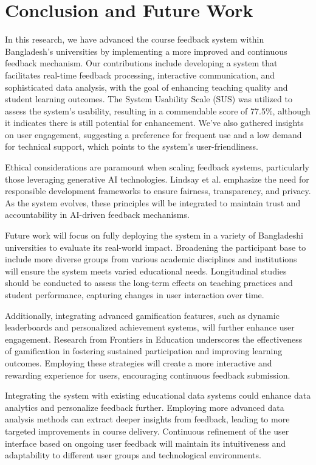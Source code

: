 \documentclass[conference]{IEEEtran}
\begin{document}
    \section{Conclusion and Future Work}

In this research, we have advanced the course feedback system within Bangladesh's universities by implementing a more improved and continuous feedback mechanism. Our contributions include developing a system that facilitates real-time feedback processing, interactive communication, and sophisticated data analysis, with the goal of enhancing teaching quality and student learning outcomes. The System Usability Scale (SUS) was utilized to assess the system's usability, resulting in a commendable score of 77.5\%, although it indicates there is still potential for enhancement. We've also gathered insights on user engagement, suggesting a preference for frequent use and a low demand for technical support, which points to the system's user-friendliness.

Ethical considerations are paramount when scaling feedback systems, particularly those leveraging generative AI technologies. Lindsay et al. \cite{lindsay2024responsibledevelopmentautomatedstudent} emphasize the need for responsible development frameworks to ensure fairness, transparency, and privacy. As the system evolves, these principles will be integrated to maintain trust and accountability in AI-driven feedback mechanisms.

Future work will focus on fully deploying the system in a variety of Bangladeshi universities to evaluate its real-world impact. Broadening the participant base to include more diverse groups from various academic disciplines and institutions will ensure the system meets varied educational needs. Longitudinal studies should be conducted to assess the long-term effects on teaching practices and student performance, capturing changes in user interaction over time.

Additionally, integrating advanced gamification features, such as dynamic leaderboards and personalized achievement systems, will further enhance user engagement. Research from Frontiers in Education \cite{10.3389/feduc.2024.1466926} underscores the effectiveness of gamification in fostering sustained participation and improving learning outcomes. Employing these strategies will create a more interactive and rewarding experience for users, encouraging continuous feedback submission.

Integrating the system with existing educational data systems could enhance data analytics and personalize feedback further. Employing more advanced data analysis methods can extract deeper insights from feedback, leading to more targeted improvements in course delivery. Continuous refinement of the user interface based on ongoing user feedback will maintain its intuitiveness and adaptability to different user groups and technological environments.
\end{document}
